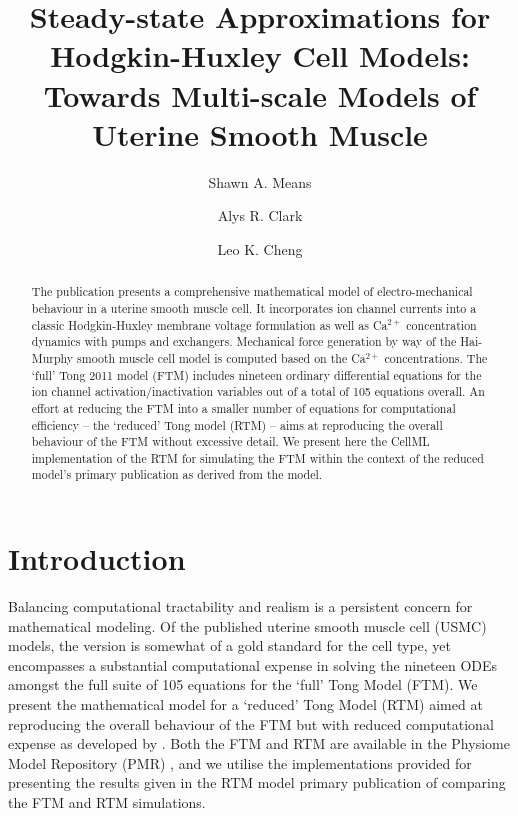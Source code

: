 \documentclass[fleqn,10pt]{physiome}
\title{Steady-state Approximations for Hodgkin-Huxley Cell Models: Towards Multi-scale Models of Uterine Smooth Muscle}
\author[1][s.means@auckland.ac.nz]{Shawn A. Means}
\author[1]{Alys R. Clark}
\author[1]{Leo K. Cheng}
\affil[1]{Auckland Bioengineering Institute, University of Auckland, New Zealand}
\newcommand{\cas}{Ca$^{2+}$ }
\begin{document}
\maketitle

\begin{abstract}
The \cite{tong2011} publication presents a comprehensive mathematical model of electro-mechanical behaviour in a uterine smooth muscle cell. It incorporates ion channel currents into a classic Hodgkin-Huxley membrane voltage formulation as well as \cas concentration dynamics with pumps and exchangers. Mechanical force generation by way of the Hai-Murphy smooth muscle cell model is computed based on the \cas concentrations. The `full' Tong 2011 model (FTM) includes nineteen ordinary differential equations for the ion channel activation/inactivation variables out of a total of 105 equations overall. An effort at reducing the FTM into a smaller number of equations for computational efficiency -- the `reduced' Tong model (RTM) -- aims at reproducing the overall behaviour of the FTM without excessive detail. We present here the CellML implementation of the RTM for simulating the FTM within the context of the reduced model's primary publication as derived from the \cite{tong2011} model.
\end{abstract}



\section{Introduction}
Balancing computational tractability and realism is a persistent concern for mathematical modeling. Of the published uterine smooth muscle cell (USMC) models, the \cite{tong2011} version is somewhat of a gold standard for the cell type, yet encompasses a substantial computational expense in solving the nineteen ODEs amongst the full suite of 105 equations for the `full' Tong Model (FTM). We present the mathematical model for a `reduced' Tong Model (RTM) aimed at reproducing the overall behaviour of the FTM but with reduced computational expense as developed by \cite{means2022}. Both the FTM and RTM are available in the Physiome Model Repository (PMR) \citep{pmr2011}, and we utilise the implementations provided for presenting the results given in the RTM model primary publication of \cite{means2022} comparing the FTM and RTM simulations.
\end{document}
